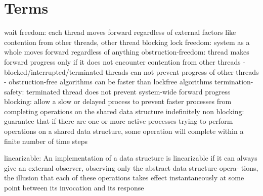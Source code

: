 
\section{Terms}

wait freedom: each thread moves forward regardless of external factors like contention from other threads, other thread blocking
lock freedom: system as a whole moves forward regardless of anything
obstruction-freedom: thread makes forward progress only if it does not encounter contention from other threads
    - blocked/interrupted/terminated threads can not prevent progress of other threads
    - obstruction-free algorithms can be faster than lockfree algorithms
termination-safety: terminated thread does not prevent system-wide forward progress
blocking: allow a slow or delayed process to prevent faster processes from completing operations on the shared data structure indefinitely
non blocking: guarantee that if there are one or more active processes trying to perform operations on a shared data structure, some operation will complete within a finite number of time steps

linearizable: An implementation of a data structure is linearizable if it can always
give an external observer, observing only the abstract data structure opera-
tions, the illusion that each of these operations takes effect instantaneously
at some point between its invocation and its response
